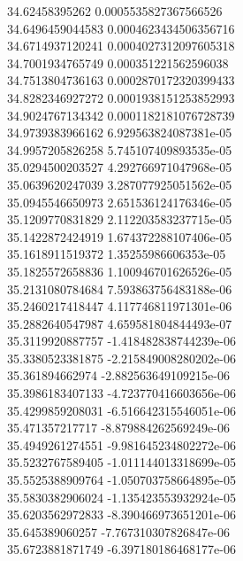 {34.62458395262 0.0005535827367566526 \\
34.6496459044583 0.0004623434506356716 \\
34.6714937120241 0.0004027312097605318 \\
34.7001934765749 0.000351221562596038 \\
34.7513804736163 0.0002870172320399433 \\
34.8282346927272 0.0001938151253852993 \\
34.9024767134342 0.0001182181076728739 \\
34.9739383966162 6.929563824087381e-05 \\
34.9957205826258 5.745107409893535e-05 \\
35.0294500203527 4.292766971047968e-05 \\
35.0639620247039 3.287077925051562e-05 \\
35.0945546650973 2.651536124176346e-05 \\
35.1209770831829 2.112203583237715e-05 \\
35.1422872424919 1.674372288107406e-05 \\
35.1618911519372 1.35255986606353e-05 \\
35.1825572658836 1.100946701626526e-05 \\
35.2131080784684 7.593863756483188e-06 \\
35.2460217418447 4.117746811971301e-06 \\
35.2882640547987 4.659581804844493e-07 \\
35.3119920887757 -1.418482838744239e-06 \\
35.3380523381875 -2.215849008280202e-06 \\
35.361894662974 -2.882563649109215e-06 \\
35.3986183407133 -4.723770416603656e-06 \\
35.4299859208031 -6.516642315546051e-06 \\
35.471357217717 -8.879884262569249e-06 \\
35.4949261274551 -9.981645234802272e-06 \\
35.5232767589405 -1.011144013318699e-05 \\
35.5525388909764 -1.050703758664895e-05 \\
35.5830382906024 -1.135423553932924e-05 \\
35.6203562972833 -8.390466973651201e-06 \\
35.645389060257 -7.767310307826847e-06 \\
35.6723881871749 -6.397180186468177e-06 \\
}
